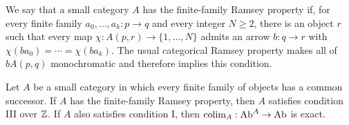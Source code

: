 \begin{definition}\label{C:ramsey-definition}
We say that a small category $A$ has the finite-family Ramsey property if,
for every finite family $a_0,\ldots,a_k:p\to q$ and every integer $N\geq2$,
there is an object $r$ such that every map
$\chi:A(p,r)\to\{1,\ldots,N\}$ admits an arrow $b:q\to r$ with
$\chi(ba_0)=\cdots=\chi(ba_k)$.
The usual categorical Ramsey property makes all of $bA(p,q)$
monochromatic and therefore implies this condition.
\end{definition}

\begin{theorem}
\label{thm:ramsey-exact}
Let $A$ be a small category in which every finite family of objects has a
common successor. If $A$ has the finite-family Ramsey property, then $A$
satisfies condition III over $\mathbb Z$. If $A$ also satisfies condition I, then
$\operatorname*{colim}_A:\mathrm{Ab}^A\to\mathrm{Ab}$ is exact.
\end{theorem}
